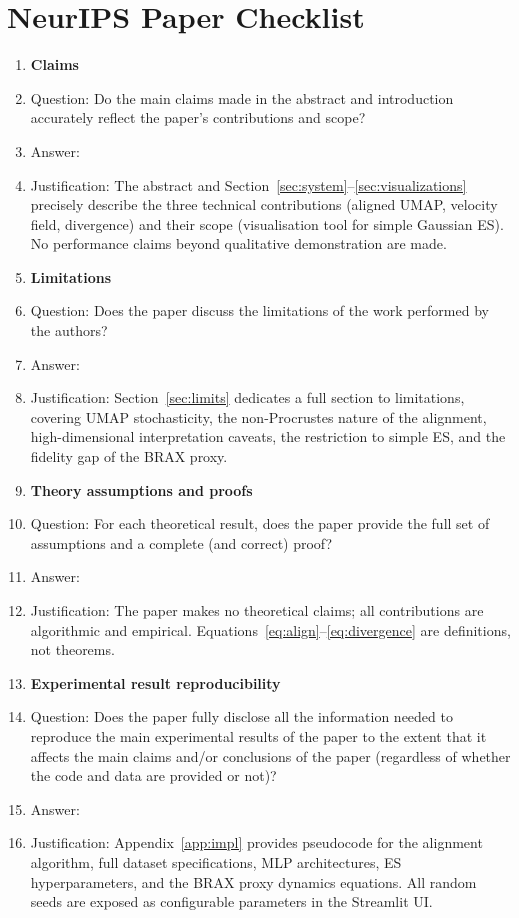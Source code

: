 \section*{NeurIPS Paper Checklist}

\begin{enumerate}

\item {\bf Claims}
    \item[] Question: Do the main claims made in the abstract and introduction accurately reflect the paper's contributions and scope?
    \item[] Answer: \answerYes{}
    \item[] Justification: The abstract and Section~\ref{sec:system}--\ref{sec:visualizations} precisely describe the three technical contributions (aligned UMAP, velocity field, divergence) and their scope (visualisation tool for simple Gaussian ES). No performance claims beyond qualitative demonstration are made.

\item {\bf Limitations}
    \item[] Question: Does the paper discuss the limitations of the work performed by the authors?
    \item[] Answer: \answerYes{}
    \item[] Justification: Section~\ref{sec:limits} dedicates a full section to limitations, covering UMAP stochasticity, the non-Procrustes nature of the alignment, high-dimensional interpretation caveats, the restriction to simple ES, and the fidelity gap of the BRAX proxy.

\item {\bf Theory assumptions and proofs}
    \item[] Question: For each theoretical result, does the paper provide the full set of assumptions and a complete (and correct) proof?
    \item[] Answer: \answerNA{}
    \item[] Justification: The paper makes no theoretical claims; all contributions are algorithmic and empirical. Equations~\eqref{eq:align}--\eqref{eq:divergence} are definitions, not theorems.

\item {\bf Experimental result reproducibility}
    \item[] Question: Does the paper fully disclose all the information needed to reproduce the main experimental results of the paper to the extent that it affects the main claims and/or conclusions of the paper (regardless of whether the code and data are provided or not)?
    \item[] Answer: \answerYes{}
    \item[] Justification: Appendix~\ref{app:impl} provides pseudocode for the alignment algorithm, full dataset specifications, MLP architectures, ES hyperparameters, and the BRAX proxy dynamics equations. All random seeds are exposed as configurable parameters in the Streamlit UI.


\end{enumerate}
